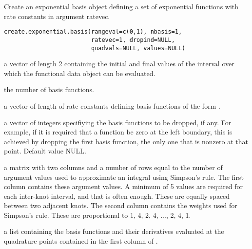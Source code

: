 \begin{Description}\relax
Create an exponential basis object defining a set of exponential
functions with rate constants in argument ratevec.
\end{Description}
\begin{Usage}
\begin{verbatim}
create.exponential.basis(rangeval=c(0,1), nbasis=1,
                         ratevec=1, dropind=NULL,
                         quadvals=NULL, values=NULL)
\end{verbatim}
\end{Usage}
\begin{Arguments}
\begin{ldescription}
\item[\code{rangeval}] a vector of length 2 containing the initial and final values of the
interval over which the functional data object can be evaluated.

\item[\code{nbasis}] the number of basis functions.

\item[\code{ratevec}] a vector of length  of rate constants
defining basis functions of the form .

\item[\code{dropind}] a vector of integers specifiying the basis functions to
be dropped, if any.  For example, if it is required that
a function be zero at the left boundary, this is achieved
by dropping the first basis function, the only one that
is nonzero at that point. Default value NULL.

\item[\code{quadvals}] a matrix with two columns and a number of rows equal to the number
of argument values used to approximate an integral using Simpson's
rule.  The first column contains these argument values.
A minimum of 5 values are required for
each inter-knot interval, and that is often enough. These
are equally spaced between two adjacent knots.
The second column contains the weights used for Simpson's
rule.  These are proportional to 1, 4, 2, 4, ..., 2, 4, 1.

\item[\code{values}] a list containing the basis functions and their derivatives
evaluated at the quadrature points contained in the first
column of .

\end{ldescription}
\end{Arguments}
